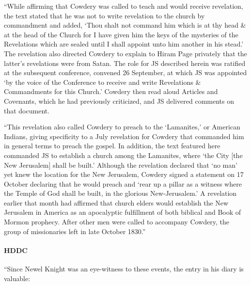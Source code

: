 			``While affirming that Cowdery was called to teach and would receive revelation, the text stated that he was not to write revelation to the church by commandment and added, `Thou shalt not command him which is at thy head \& at the head of the Church for I have given him the keys of the mysteries of the Revelations which are sealed until I shall appoint unto him another in his stead.' The revelation also directed Cowdery to explain to Hiram Page privately that the latter's revelations were from Satan. The role for JS described herein was ratified at the subsequent conference, convened 26 September, at which JS was appointed `by the voice of the Conference to receive and write Revelations \& Commandments for this Church.' Cowdery then read aloud Articles and Covenants, which he had previously criticized, and JS delivered comments on that document.
			
			``This revelation also called Cowdery to preach to the `Lamanites,' or American Indians, giving specificity to a July revelation for Cowdery that commanded him in general terms to preach the gospel. In addition, the text featured here commanded JS to establish a church among the Lamanites, where `the City [the New Jerusalem] shall be built.' Although the revelation declared that `no man' yet knew the location for the New Jerusalem, Cowdery signed a statement on 17 October declaring that he would preach and `rear up a pillar as a witness where the Temple of God shall be built, in the glorious New-Jerusalem.' A revelation earlier that month had affirmed that church elders would establish the New Jerusalem in America as an apocalyptic fulfillment of both biblical and Book of Mormon prophecy. After other men were called to accompany Cowdery, the group of missionaries left in late October 1830.''
			
		\paragraph{HDDC}
		
			``Since Newel Knight was an eye-witness to these events, the entry in his diary is valuable:
			
